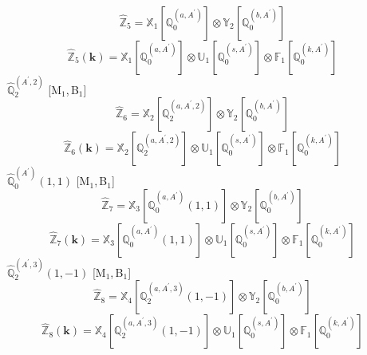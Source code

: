 \documentclass[fleqn,10pt,landscape]{article}
\begin{document}
\begin{itemize}
\begin{dmath*}
\hat{\mathbb{Z}}_{5}=\mathbb{X}_{1}[\mathbb{Q}_{0}^{(a,A^{\prime})}] \otimes\mathbb{Y}_{2}[\mathbb{Q}_{0}^{(b,A^{\prime})}]
\end{dmath*}
\begin{dmath*}
\hat{\mathbb{Z}}_{5}(\bm{k})=\mathbb{X}_{1}[\mathbb{Q}_{0}^{(a,A^{\prime})}] \otimes\mathbb{U}_{1}[\mathbb{Q}_{0}^{(s,A^{\prime})}] \otimes\mathbb{F}_{1}[\mathbb{Q}_{0}^{(k,A^{\prime})}]
\end{dmath*}
\vspace{4mm}
\noindent {} $\,\,\,\hat{\mathbb{Q}}_{2}^{(A^{\prime},2)}$ [M$_{1}$,\,B$_{1}$]
\begin{dmath*}
\hat{\mathbb{Z}}_{6}=\mathbb{X}_{2}[\mathbb{Q}_{2}^{(a,A^{\prime},2)}] \otimes\mathbb{Y}_{2}[\mathbb{Q}_{0}^{(b,A^{\prime})}]
\end{dmath*}
\begin{dmath*}
\hat{\mathbb{Z}}_{6}(\bm{k})=\mathbb{X}_{2}[\mathbb{Q}_{2}^{(a,A^{\prime},2)}] \otimes\mathbb{U}_{1}[\mathbb{Q}_{0}^{(s,A^{\prime})}] \otimes\mathbb{F}_{1}[\mathbb{Q}_{0}^{(k,A^{\prime})}]
\end{dmath*}
\vspace{4mm}
\noindent {} $\,\,\,\hat{\mathbb{Q}}_{0}^{(A^{\prime})}(1,1)$ [M$_{1}$,\,B$_{1}$]
\begin{dmath*}
\hat{\mathbb{Z}}_{7}=\mathbb{X}_{3}[\mathbb{Q}_{0}^{(a,A^{\prime})}(1,1)] \otimes\mathbb{Y}_{2}[\mathbb{Q}_{0}^{(b,A^{\prime})}]
\end{dmath*}
\begin{dmath*}
\hat{\mathbb{Z}}_{7}(\bm{k})=\mathbb{X}_{3}[\mathbb{Q}_{0}^{(a,A^{\prime})}(1,1)] \otimes\mathbb{U}_{1}[\mathbb{Q}_{0}^{(s,A^{\prime})}] \otimes\mathbb{F}_{1}[\mathbb{Q}_{0}^{(k,A^{\prime})}]
\end{dmath*}
\vspace{4mm}
\noindent {} $\,\,\,\hat{\mathbb{Q}}_{2}^{(A^{\prime},3)}(1,-1)$ [M$_{1}$,\,B$_{1}$]
\begin{dmath*}
\hat{\mathbb{Z}}_{8}=\mathbb{X}_{4}[\mathbb{Q}_{2}^{(a,A^{\prime},3)}(1,-1)] \otimes\mathbb{Y}_{2}[\mathbb{Q}_{0}^{(b,A^{\prime})}]
\end{dmath*}
\begin{dmath*}
\hat{\mathbb{Z}}_{8}(\bm{k})=\mathbb{X}_{4}[\mathbb{Q}_{2}^{(a,A^{\prime},3)}(1,-1)] \otimes\mathbb{U}_{1}[\mathbb{Q}_{0}^{(s,A^{\prime})}] \otimes\mathbb{F}_{1}[\mathbb{Q}_{0}^{(k,A^{\prime})}]
\end{dmath*}
\vspace{4mm}

\end{itemize}
\end{document}
